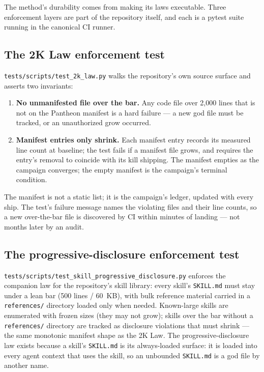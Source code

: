 \documentclass[11pt]{article}
\theoremstyle{definition}
\theoremstyle{plain}
\theoremstyle{remark}
\begin{document}
The method's durability comes from making its laws executable. Three
enforcement layers are part of the repository itself, and each is a pytest
suite running in the canonical CI runner.

\subsection{The 2K Law enforcement test}

\texttt{tests/scripts/test\_2k\_law.py} walks the repository's own source
surface and asserts two invariants:

\begin{enumerate}[leftmargin=*]
\item \textbf{No unmanifested file over the bar.} Any code file over
  2{,}000 lines that is not on the Pantheon manifest is a hard failure --- a
  new god file must be tracked, or an unauthorized grow occurred.
\item \textbf{Manifest entries only shrink.} Each manifest entry records its
  measured line count at baseline; the test fails if a manifest file grows,
  and requires the entry's removal to coincide with its kill shipping. The
  manifest empties as the campaign converges; the empty manifest is the
  campaign's terminal condition.
\end{enumerate}

The manifest is not a static list; it is the campaign's ledger, updated with
every ship. The test's failure message names the violating files and their
line counts, so a new over-the-bar file is discovered by CI within minutes
of landing --- not months later by an audit.

\subsection{The progressive-disclosure enforcement test}

\texttt{tests/scripts/test\_skill\_progressive\_disclosure.py} enforces the
companion law for the repository's skill library: every skill's
\texttt{SKILL.md} must stay under a lean bar (500 lines / 60~KB), with bulk
reference material carried in a \texttt{references/} directory loaded only
when needed. Known-large skills are enumerated with frozen sizes (they may
not grow); skills over the bar without a \texttt{references/} directory are
tracked as disclosure violations that must shrink --- the same monotonic
manifest shape as the 2K Law. The progressive-disclosure law exists because
a skill's \texttt{SKILL.md} is its always-loaded surface: it is loaded into
every agent context that uses the skill, so an unbounded \texttt{SKILL.md}
is a god file by another name.
\end{document}

